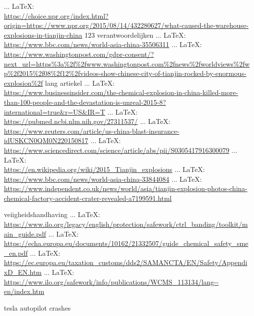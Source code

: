 \begin{thebibliography}{99}
 ... \LaTeX:\\ \url{https://choice.npr.org/index.html?origin=https://www.npr.org/2015/08/14/432280627/what-caused-the-warehouse-explosions-in-tianjin-china}
123 verantwoordelijken
 ... \LaTeX:\\ \url{https://www.bbc.com/news/world-asia-china-35506311}
 ... \LaTeX:\\ \url{https://www.washingtonpost.com/gdpr-consent/?next_url=https%3a%2f%2fwww.washingtonpost.com%2fnews%2fworldviews%2fwp%2f2015%2f08%2f12%2fvideos-show-chinese-city-of-tianjin-rocked-by-enormous-explosion%2f}
lang artiekel
 ... \LaTeX:\\ \url{https://www.businessinsider.com/the-chemical-explosion-in-china-killed-more-than-100-people-and-the-devastation-is-unreal-2015-8?international=true&r=US&IR=T}
 ... \LaTeX:\\ \url{https://pubmed.ncbi.nlm.nih.gov/27311537/}
 ... \LaTeX:\\ \url{https://www.reuters.com/article/us-china-blast-insurance-idUSKCN0QM0N220150817}
 ... \LaTeX:\\ \url{https://www.sciencedirect.com/science/article/abs/pii/S0305417916300079}
 ... \LaTeX:\\ \url{https://en.wikipedia.org/wiki/2015_Tianjin_explosions}
 ... \LaTeX:\\ \url{https://www.bbc.com/news/world-asia-china-33844084}
 ... \LaTeX:\\ \url{https://www.independent.co.uk/news/world/asia/tianjin-explosion-photos-china-chemical-factory-accident-crater-revealed-a7199591.html}

veiigheidshandhaving
 ... \LaTeX:\\ \url{https://www.ilo.org/legacy/english/protection/safework/ctrl_banding/toolkit/main_guide.pdf}
 ... \LaTeX:\\ \url{https://echa.europa.eu/documents/10162/21332507/guide_chemical_safety_sme_en.pdf}
 ... \LaTeX:\\ \url{https://ec.europa.eu/taxation_customs/dds2/SAMANCTA/EN/Safety/AppendixD_EN.htm}
 ... \LaTeX:\\ \url{https://www.ilo.org/safework/info/publications/WCMS_113134/lang--en/index.htm}


tesla autopilot crashes



\end{thebibliography}
